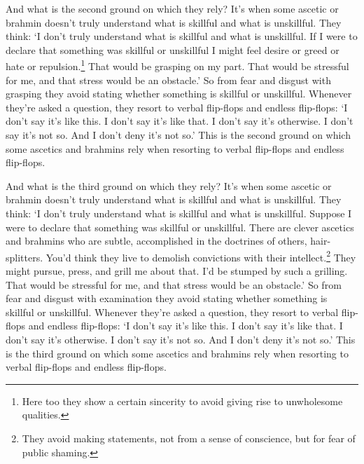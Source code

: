 \documentclass[12pt,openany]{book}%
\begin{document}
And what is the second ground on which they rely? It’s when some ascetic or brahmin doesn’t truly understand what is skillful and what is unskillful. They think: ‘I don’t truly understand what is skillful and what is unskillful. If I were to declare that something was skillful or unskillful I might feel desire or greed or hate or repulsion.\footnote{Here too they show a certain sincerity to avoid giving rise to unwholesome qualities. } That would be grasping on my part. That would be stressful for me, and that stress would be an obstacle.’ So from fear and disgust with grasping they avoid stating whether something is skillful or unskillful. Whenever they’re asked a question, they resort to verbal flip-flops and endless flip-flops: ‘I don’t say it’s like this. I don’t say it’s like that. I don’t say it’s otherwise. I don’t say it’s not so. And I don’t deny it’s not so.’ This is the second ground on which some ascetics and brahmins rely when resorting to verbal flip-flops and endless flip-flops. 

And what is the third ground on which they rely? It’s when some ascetic or brahmin doesn’t truly understand what is skillful and what is unskillful. They think: ‘I don’t truly understand what is skillful and what is unskillful. Suppose I were to declare that something was skillful or unskillful. There are clever ascetics and brahmins who are subtle, accomplished in the doctrines of others, hair-splitters. You’d think they live to demolish convictions with their intellect.\footnote{They avoid making statements, not from a sense of conscience, but for fear of public shaming. } They might pursue, press, and grill me about that. I’d be stumped by such a grilling. That would be stressful for me, and that stress would be an obstacle.’ So from fear and disgust with examination they avoid stating whether something is skillful or unskillful. Whenever they’re asked a question, they resort to verbal flip-flops and endless flip-flops: ‘I don’t say it’s like this. I don’t say it’s like that. I don’t say it’s otherwise. I don’t say it’s not so. And I don’t deny it’s not so.’ This is the third ground on which some ascetics and brahmins rely when resorting to verbal flip-flops and endless flip-flops. 
\end{document}
